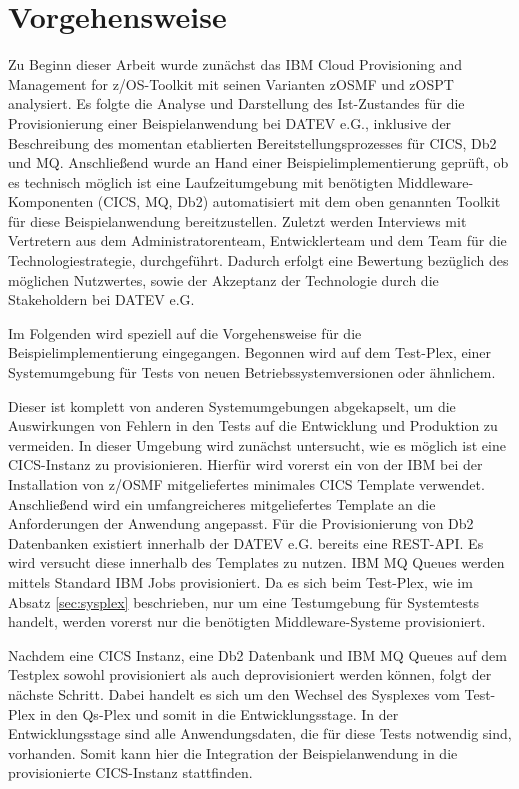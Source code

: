 \chapter{Vorgehensweise}\label{ch:vorgehensweise}
Zu Beginn dieser Arbeit wurde zunächst das \glqq IBM Cloud Provisioning and Management for z/OS\grqq-Toolkit mit seinen Varianten zOSMF und zOSPT analysiert.
Es folgte die Analyse und Darstellung des Ist-Zustandes für die  Provisionierung einer Beispielanwendung bei DATEV e.G., inklusive der Beschreibung des momentan etablierten Bereitstellungsprozesses für CICS, Db2 und MQ.
Anschließend wurde an Hand einer Beispielimplementierung geprüft, ob es technisch möglich ist eine Laufzeitumgebung mit benötigten Middleware-Komponenten (CICS, MQ, Db2) automatisiert mit dem oben genannten Toolkit für diese Beispielanwendung bereitzustellen.
Zuletzt werden Interviews mit Vertretern aus dem Administratorenteam, Entwicklerteam und dem Team für die Technologiestrategie, durchgeführt.
Dadurch erfolgt eine Bewertung bezüglich des möglichen Nutzwertes, sowie der Akzeptanz der Technologie durch die Stakeholdern bei DATEV e.G.

Im Folgenden wird speziell auf die Vorgehensweise für die Beispielimplementierung eingegangen. 
Begonnen wird auf dem Test-Plex, einer Systemumgebung für Tests von neuen Betriebssystemversionen oder ähnlichem.

Dieser ist komplett von anderen Systemumgebungen abgekapselt, um die Auswirkungen von Fehlern in den Tests auf die Entwicklung und Produktion zu vermeiden.
In dieser Umgebung wird zunächst untersucht, wie es möglich ist eine CICS-Instanz zu provisionieren.
Hierfür wird vorerst ein von der IBM bei der Installation von z/OSMF mitgeliefertes minimales CICS Template verwendet.
Anschließend wird ein umfangreicheres mitgeliefertes Template an die Anforderungen der Anwendung angepasst.
Für die Provisionierung von Db2 Datenbanken existiert innerhalb der DATEV e.G. bereits eine REST-API.
Es wird versucht diese innerhalb des Templates zu nutzen.
IBM MQ Queues werden mittels Standard IBM Jobs provisioniert.
Da es sich beim Test-Plex, wie im Absatz \ref{sec:sysplex} beschrieben, nur um eine Testumgebung für Systemtests handelt, werden vorerst nur die benötigten Middleware-Systeme provisioniert.

Nachdem eine CICS Instanz, eine Db2 Datenbank und IBM MQ Queues auf dem Testplex sowohl provisioniert als auch deprovisioniert werden können, folgt der nächste Schritt.
Dabei handelt es sich um den Wechsel des Sysplexes vom Test-Plex in den Qs-Plex und somit in die Entwicklungsstage.
In der Entwicklungsstage sind alle Anwendungsdaten, die für diese Tests notwendig sind, vorhanden.
Somit kann hier die Integration der Beispielanwendung in die provisionierte CICS-Instanz stattfinden.


